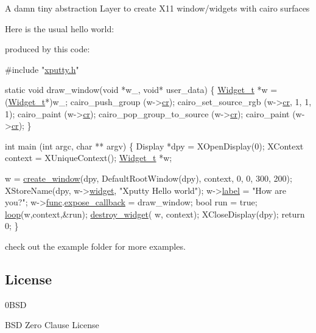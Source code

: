 A damn tiny abstraction Layer to create X11 window/widgets with cairo surfaces

Here is the usual hello world\+:



produced by this code\+:


\begin{DoxyCode}
\textcolor{preprocessor}{#include "\hyperlink{xputty_8h}{xputty.h}"}

\textcolor{keyword}{static} \textcolor{keywordtype}{void} draw\_window(\textcolor{keywordtype}{void} *w\_, \textcolor{keywordtype}{void}* user\_data) \{
    \hyperlink{structWidget__t}{Widget\_t} *w = (\hyperlink{structWidget__t}{Widget\_t}*)w\_;
    cairo\_push\_group (w->\hyperlink{structWidget__t_a26594f6ffabe98fc08f9207150fc9417}{cr});
    cairo\_set\_source\_rgb (w->\hyperlink{structWidget__t_a26594f6ffabe98fc08f9207150fc9417}{cr}, 1, 1, 1);
    cairo\_paint (w->\hyperlink{structWidget__t_a26594f6ffabe98fc08f9207150fc9417}{cr});
    cairo\_pop\_group\_to\_source (w->\hyperlink{structWidget__t_a26594f6ffabe98fc08f9207150fc9417}{cr});
    cairo\_paint (w->\hyperlink{structWidget__t_a26594f6ffabe98fc08f9207150fc9417}{cr});
\}

\textcolor{keywordtype}{int} main (\textcolor{keywordtype}{int} argc, \textcolor{keywordtype}{char} ** argv)
\{
    Display *dpy = XOpenDisplay(0);
    XContext context =  XUniqueContext();
    \hyperlink{structWidget__t}{Widget\_t} *w;

    w = \hyperlink{xwidget_8c_a9c5b8eaf662ac4fb7d2674bf7e89ab8c}{create\_window}(dpy, DefaultRootWindow(dpy), context, 0, 0, 300, 200);
    XStoreName(dpy, w->\hyperlink{structWidget__t_acb2bfb41674371ee1220a9d6a2d89fb1}{widget}, \textcolor{stringliteral}{"Xputty Hello world"});
    w->\hyperlink{structWidget__t_a952020107ac1f6d9a37b4f978f77b61c}{label} = \textcolor{stringliteral}{"How are you?"};
    w->\hyperlink{structWidget__t_a225b9a175e132994a5aa73b59a2911ad}{func}.\hyperlink{structFunc__t_ae4ba307ec29bfea83e1197aa750c1396}{expose\_callback} = draw\_window;
    \textcolor{keywordtype}{bool} run = \textcolor{keyword}{true};
    \hyperlink{xwidget_8c_a5dc619d89042819195db7e744dcd5f7d}{loop}(w,context,&run);
    \hyperlink{xwidget_8c_a540b0eefd6f19f487aa71d4c1798ac8c}{destroy\_widget}( w, context);
    XCloseDisplay(dpy);
    \textcolor{keywordflow}{return} 0;
\}
\end{DoxyCode}


check out the example folder for more examples.

\subsection*{License}

\begin{DoxyVerb}     0BSD 
\end{DoxyVerb}
 B\+SD Zero Clause License 